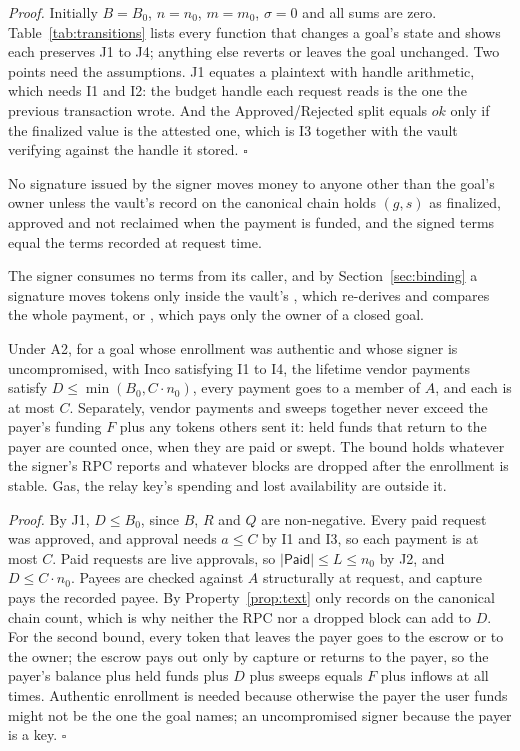 \noindent\emph{Proof.} Initially $B = B_0$, $n = n_0$, $m = m_0$, $\sigma = 0$ and all sums are zero. Table~\ref{tab:transitions} lists
every function that changes a goal's state and shows each preserves J1 to J4; anything else reverts or leaves the goal unchanged.
Two points need the assumptions. J1 equates a plaintext with handle arithmetic, which needs I1 and I2: the budget handle each request reads
is the one the previous transaction wrote. And the \textsf{Approved}/\textsf{Rejected} split equals $\mathit{ok}$ only if the finalized value
is the attested one, which is I3 together with the vault verifying against the handle it stored. \hfill$\square$

\begin{property}\label{prop:text}
No signature issued by the signer moves money to anyone other than the goal's owner unless the vault's record on the canonical chain holds
$(g, s)$ as finalized, approved and not reclaimed when the payment is funded, and the signed terms equal the terms recorded at request time.
\end{property}

\noindent The signer consumes no terms from its caller, and by Section~\ref{sec:binding} a signature moves tokens only inside the vault's
, which re-derives and compares the whole payment, or , which pays only the owner of a closed goal.

\begin{theorem}\label{prop:loss}
Under A2, for a goal whose enrollment was authentic and whose signer is uncompromised, with Inco satisfying I1 to I4, the lifetime vendor
payments satisfy $D \le \min(B_0, C\cdot n_0)$, every payment goes to a member of $A$, and each is at most $C$. Separately, vendor payments and
sweeps together never exceed the payer's funding $F$ plus any tokens others sent it: held funds that return to the payer are counted once, when
they are paid or swept. The bound holds whatever the signer's RPC reports and whatever blocks are dropped after the enrollment is stable.
Gas, the relay key's spending and lost availability are outside it.
\end{theorem}

\noindent\emph{Proof.} By J1, $D \le B_0$, since $B$, $R$ and $Q$ are non-negative. Every paid request was approved, and approval needs
$a \le C$ by I1 and I3, so each payment is at most $C$. Paid requests are live approvals, so $|\textsf{Paid}| \le L \le n_0$ by J2, and
$D \le C\cdot n_0$. Payees are checked against $A$ structurally at request, and capture pays the recorded payee. By Property~\ref{prop:text}
only records on the canonical chain count, which is why neither the RPC nor a dropped block can add to $D$. For the second bound, every
token that leaves the payer goes to the escrow or to the owner; the escrow pays out only by capture or returns to the payer, so the payer's
balance plus held funds plus $D$ plus sweeps equals $F$ plus inflows at all times. Authentic enrollment is needed because otherwise the payer
the user funds might not be the one the goal names; an uncompromised signer because the payer is a key. \hfill$\square$


